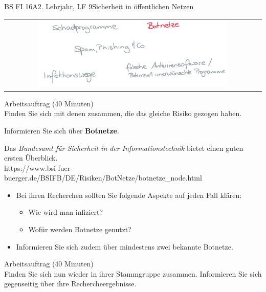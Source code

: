 \documentclass[oneside,openany,headings=optiontotoc,11pt,numbers=noenddot]{scrreprt}
\begin{document}
\begin{worksheet}{BS FI 16A}{2. Lehrjahr, LF 9}{Sicherheit in öffentlichen Netzen}
		\newpage
		\setcounter{page}{1}
		\begin{framed}
			\begin{tabular}{lcr}
				& \includegraphics[width=0.8\textwidth]{Bilder/Botnetze.jpg} & \\
			\end{tabular}
		\end{framed}
		\color{codegray}Arbeitsauftrag (40 Minuten)\\
		\color{black}
		Finden Sie sich mit denen zusammen, die das gleiche Risiko gezogen haben.
		\par
		\bigskip
		\noindent
		Informieren Sie sich über \textbf{Botnetze}.
		\par
		\bigskip
		\noindent
		Das \textit{Bundesamt für Sicherheit in der Informationstechnik} bietet einen guten ersten Überblick.\\
		\small{\color{codegray}https://www.bsi-fuer-buerger.de/BSIFB/DE/Risiken/BotNetze/botnetze\_node.html}
		\normalsize
		\begin{itemize}
			\item[] Bei ihren Recherchen sollten Sie folgende Aspekte auf jeden Fall klären:
			\begin{itemize}
				\item Wie wird man infiziert?
				\item Wofür werden Botnetze genutzt?
			\end{itemize}
			\item[] Informieren Sie sich zudem über mindestens zwei bekannte Botnetze.
		\end{itemize}
		\par
		\bigskip
		\noindent
		
		\color{codegray}Arbeitsauftrag (40 Minuten)\\
		\color{black}
		Finden Sie sich nun wieder in ihrer Stammgruppe zusammen. Informieren Sie sich gegenseitig über ihre Rechercheergebnisse.
	

\end{worksheet}
\end{document}
